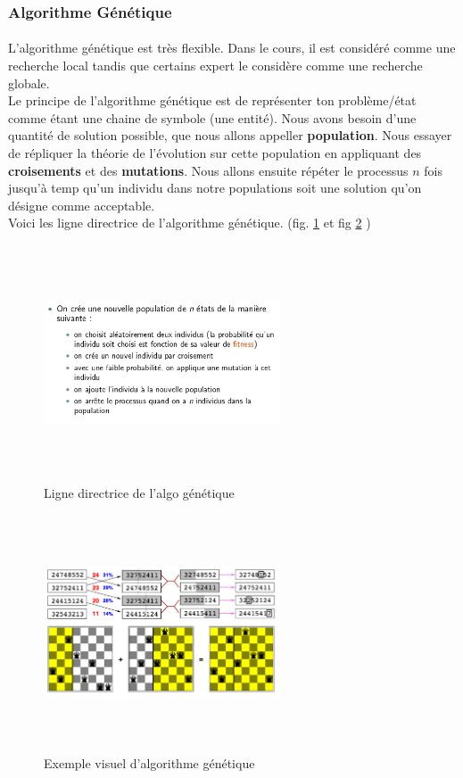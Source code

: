\documentclass[oneside]{book}
\begin{document}
\subsubsection{Algorithme Génétique}
\paragraph{}
L'algorithme génétique est très flexible. Dans le cours, il est considéré comme une recherche local tandis que certains expert le considère comme une recherche globale. \\

Le principe de l'algorithme génétique est de représenter ton problème/état comme étant une chaine de symbole (une entité). Nous avons besoin d'une quantité de solution possible, que nous allons appeller \textbf{population}. Nous essayer de répliquer la théorie de l'évolution sur cette population en appliquant des \textbf{croisements} et des \textbf{mutations}. Nous allons ensuite répéter le processus $n$ fois jusqu'à temp qu'un individu dans notre populations soit une solution qu'on désigne comme acceptable.\\

Voici les ligne directrice de l'algorithme génétique. (fig. \ref{fig:algo_genetique} et fig \ref{fig:exemple_algo_genetique} ) 

\begin{figure}[h!t]
\centering
\includegraphics[width = 7cm, height = 7cm, keepaspectratio]{algo_genetique.png}
\caption{Ligne directrice de l'algo génétique}
\label{fig:algo_genetique}
\end{figure}


\begin{figure}[h!t]
\centering
\includegraphics[width = 7cm, height = 7cm, keepaspectratio]{exemple_algo_genetique.png}
\caption{Exemple visuel d'algorithme génétique}
\label{fig:exemple_algo_genetique}
\end{figure}
\end{document}
